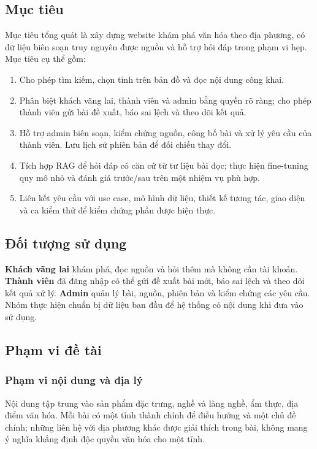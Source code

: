 \subsection{Mục tiêu}
Mục tiêu tổng quát là xây dựng website khám phá văn hóa theo địa phương,
có dữ liệu biên soạn truy nguyên được nguồn và hỗ trợ hỏi đáp trong phạm vi
hẹp. Mục tiêu cụ thể gồm:
\begin{enumerate}
  \item Cho phép tìm kiếm, chọn tỉnh trên bản đồ và đọc nội dung công khai.
  \item Phân biệt khách vãng lai, thành viên và admin bằng quyền rõ ràng;
  cho phép thành viên gửi bài đề xuất, báo sai lệch và theo dõi kết quả.
  \item Hỗ trợ admin biên soạn, kiểm chứng nguồn, công bố bài và xử lý
  yêu cầu của thành viên. Lưu lịch sử phiên bản để đối chiếu thay đổi.
  \item Tích hợp RAG để hỏi đáp có căn cứ từ tư liệu bài đọc; thực hiện
  fine-tuning quy mô nhỏ và đánh giá trước/sau trên một nhiệm vụ phù hợp.
  \item Liên kết yêu cầu với use case, mô hình dữ liệu, thiết kế tương tác,
  giao diện và ca kiểm thử để kiểm chứng phần được hiện thực.
\end{enumerate}

\ReportNeedSpace{33mm}
\subsection{Đối tượng sử dụng}
\textbf{Khách vãng lai} khám phá, đọc nguồn và hỏi thêm mà không cần tài
khoản. \textbf{Thành viên} đã đăng nhập có thể gửi đề xuất bài mới, báo
sai lệch và theo dõi kết quả xử lý. \textbf{Admin} quản lý bài, nguồn,
phiên bản và kiểm chứng các yêu cầu. Nhóm thực hiện chuẩn bị dữ liệu
ban đầu để hệ thống có nội dung khi đưa vào sử dụng.

\subsection{Phạm vi đề tài}
\subsubsection{Phạm vi nội dung và địa lý}
Nội dung tập trung vào sản phẩm đặc trưng, nghề và làng nghề, ẩm thực, địa
điểm văn hóa. Mỗi bài có một tỉnh thành chính để điều hướng và một chủ đề
chính; những liên hệ với địa phương khác được giải thích trong bài, không
mang ý nghĩa khẳng định độc quyền văn hóa cho một tỉnh.

